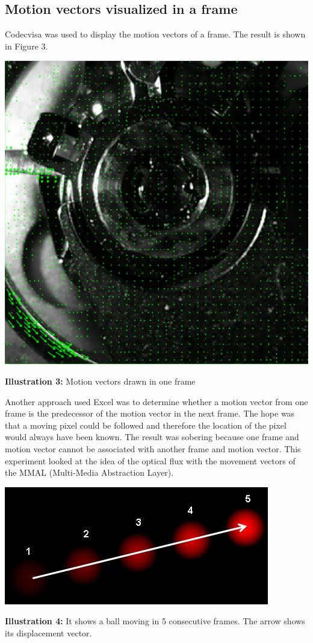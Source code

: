 \documentclass[12pt, a4paper]{report}
\begin{document}
\subsection{Motion vectors visualized in a frame}
Codecvisa was used to display the motion vectors of a frame.
The result is shown in Figure 3.
\bigskip
\noindent
\begin{center}
\includegraphics[scale=0.4]{Images/motion_vectors.png}

{\bf Illustration 3:}  Motion vectors drawn in one frame
\end{center}
\bigskip

Another approach used Excel was to determine whether a motion vector from one frame is the predecessor of the motion vector in the next frame.
The hope was that a moving pixel could be followed and therefore the location of the pixel would always have been known.
The result was sobering because one frame and motion vector cannot be associated with another frame and motion vector.
This experiment looked at the idea of the optical flux with the movement vectors of the MMAL (Multi-Media Abstraction Layer).

\noindent
\begin{center}
\includegraphics[scale=0.55]{Images/optical_flow_basic1.jpg}

{\bf Illustration 4:}  It shows a ball moving in 5 consecutive frames. The arrow shows its displacement vector.
\end{center}
\end{document}
